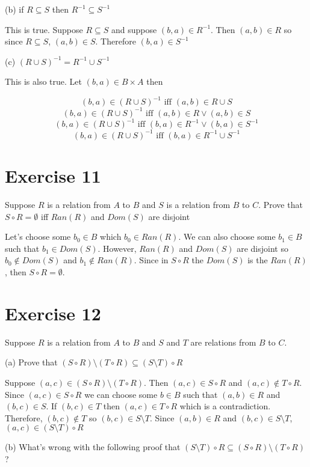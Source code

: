 \documentclass[11pt]{article}
\begin{document}
\noindent (b) if $R \subseteq S$ then $R^{-1} \subseteq S^{-1}$

This is true. Suppose $R \subseteq S$ and suppose $(b,a) \in R^{-1}$. Then 
$(a,b) \in R$ so since $R \subseteq S$, $(a,b) \in S$. Therefore $(b,a) \in S^{-1}$

\noindent (c) $(R \cup S)^{-1} = R^{-1} \cup S^{-1}$

This is also true. Let $(b,a) \in B \times A$ then 

$$(b, a) \in (R \cup S)^{-1} \text{ iff } (a,b) \in R \cup S$$
$$(b, a) \in (R \cup S)^{-1} \text{ iff } (a,b) \in R \vee (a, b) \in S$$
$$(b, a) \in (R \cup S)^{-1} \text{ iff } (b,a) \in R^{-1} \vee (b,a) \in S^{-1}$$
$$(b, a) \in (R \cup S)^{-1} \text{ iff } (b,a) \in R^{-1} \cup S^{-1}$$

\section*{Exercise 11}

Suppose $R$ is a relation from $A$ to $B$ and $S$ is a relation from $B$ to $C$. 
Prove that $S \circ R = \emptyset$ iff $Ran(R)$ and $Dom(S)$ are disjoint 

Let's choose some $b_0 \in B$ which $b_0 \in Ran(R)$. We can also choose some 
$b_1 \in B$ such that $b_1 \in Dom(S)$. However, $Ran(R)$ and $Dom(S)$ are 
disjoint so $b_0 \notin Dom(S)$ and $b_1 \notin Ran(R)$. Since in $S \circ R$ 
the $Dom(S)$ is the $Ran(R)$, then $S \circ R = \emptyset$.

\section*{Exercise 12}

Suppose $R$ is a relation from $A$ to $B$ and $S$ and $T$ are relations from 
$B$ to $C$.

\noindent (a) Prove that $(S \circ R) \setminus (T \circ R) \subseteq (S \setminus T) \circ R$

Suppose $(a,c) \in (S \circ R) \setminus (T \circ R)$. Then $(a,c) \in S \circ R$ 
and $(a,c) \notin T \circ R$. Since $(a,c) \in S \circ R$ we can choose some 
$b \in B$ such that $(a,b) \in R$ and $(b,c) \in S$. If $(b,c) \in T$ then 
$(a, c) \in T \circ R$ which is a contradiction. Therefore, $(b,c) \notin T$ 
so $(b,c) \in S \setminus T$. Since $(a,b) \in R$ and $(b,c) \in S \setminus T$,
$(a,c) \in (S \setminus T) \circ R$

\noindent (b) What's wrong with the following proof that 
$(S \setminus T) \circ R \subseteq (S \circ R) \setminus (T \circ R)$?
\end{document}
